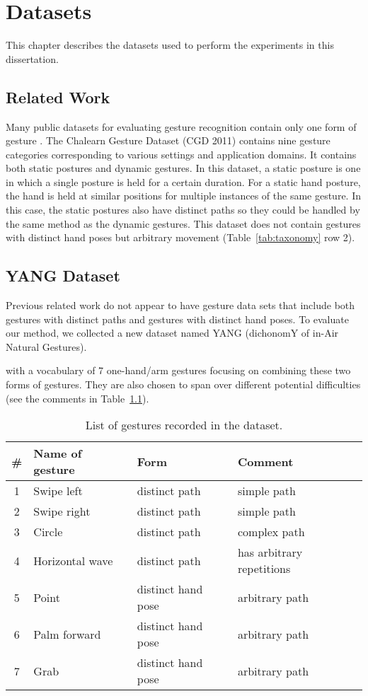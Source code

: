 \chapter{Datasets}

This chapter describes the datasets used to perform the experiments in this
dissertation.

\section{Related Work}
\cite{escalera2013}
Many public datasets for evaluating gesture recognition contain only one form
of gesture \cite{Song11, Ruffieux2013, marcel99}. The Chalearn Gesture Dataset (CGD
2011) \cite{guyon13} contains nine gesture categories corresponding to various settings and application domains.
 It contains both static postures and dynamic gestures. In this dataset, a static
posture is one in which a single posture is held for a certain duration. For a
static hand posture, the hand is held at similar positions for multiple
instances of the same gesture. In this case, the static postures also have
distinct paths so they could be handled by the same method as the dynamic
gestures.
This dataset does not contain gestures with distinct hand poses but arbitrary movement
(Table~\ref{tab:taxonomy} row 2).

\section{YANG Dataset}
Previous related work do not appear to have gesture data sets
that include both gestures with distinct paths and gestures with distinct hand
poses. To evaluate our method, we collected a new dataset named YANG (dichonomY
of in-Air Natural Gestures).

with a vocabulary of 7
one-hand/arm gestures focusing on combining these two forms of gestures. They
are also chosen to span over different potential difficulties (see the comments in Table~\ref{tab:gestures}).

\begin{table}
\caption{List of gestures recorded in the dataset.}
\label{tab:gestures}
\centering
\begin{tabular}{|c|l|l|l|}
\hline
\# & Name of gesture & Form & Comment \\
\hline
1 & Swipe left & distinct path & simple path \\
\hline
2 & Swipe right & distinct path & simple path \\
\hline
3 & Circle & distinct path & complex path \\
\hline
4 & Horizontal wave & distinct path & has arbitrary repetitions \\
\hline
5 & Point & distinct hand pose & arbitrary path \\
\hline
6 & Palm forward & distinct hand pose & arbitrary path \\
\hline
7 & Grab & distinct hand pose & arbitrary path \\
\hline
\end{tabular}
\end{table}

